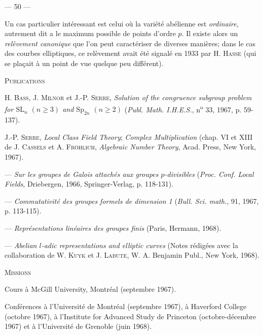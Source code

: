 \begin{center}--- 50 ---\end{center}

Un cas particulier intéressant est celui où la variété abélienne est \textit{ordinaire}, autrement dit a le maximum possible de points d'ordre $p$. Il existe alors un \textit{relèvement canonique} que l'on peut caractériser de diverses manières; dans le cas des courbes elliptiques, ce relèvement avait été signalé en 1933 par H. \textsc{Hasse} (qui se plaçait à un point de vue quelque peu différent).

\begin{center}\textsc{Publications}\end{center}

H. \textsc{Bass}, J. \textsc{Milnor} et J.-P. \textsc{Serre}, \textit{Solution of the congruence subgroup problem for $\mathrm{SL}_n$ $(n\geq3)$ and $\mathrm{Sp}_{2n}$ $(n\geq2)$} (\textit{Publ. Math. I.H.E.S.}, n\textsuperscript{o} 33, 1967, p. 59-137).

J.-P. \textsc{Serre}, \textit{Local Class Field Theory}; \textit{Complex Multiplication} (chap. VI et XIII de J. \textsc{Cassels} et A. \textsc{Fröhlich}, \textit{Algebraic Number Theory}, Acad. Press, New York, 1967).

--- \textit{Sur les groupes de Galois attachés aux groupes $p$-divisibles} (\textit{Proc. Conf. Local Fields}, Driebergen, 1966, Springer-Verlag, p. 118-131).

--- \textit{Commutativité des groupes formels de dimension 1} (\textit{Bull. Sci. math.}, 91, 1967, p. 113-115).

--- \textit{Représentations linéaires des groupes finis} (Paris, Hermann, 1968).

--- \textit{Abelian $l$-adic representations and elliptic curves} (Notes rédigées avec la collaboration de W. \textsc{Kuyk} et J. \textsc{Labute}, W. A. Benjamin Publ., New York, 1968).

\begin{center}\textsc{Missions}\end{center}

Cours à McGill University, Montréal (septembre 1967).

Conférences à l'Université de Montréal (septembre 1967), à Haverford College (octobre 1967), à l'Institute for Advanced Study de Princeton (octobre-décembre 1967) et à l'Université de Grenoble (juin 1968).
